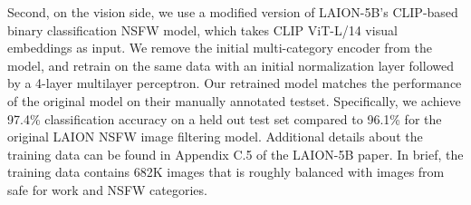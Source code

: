 \begin{table}
\renewcommand{\arraystretch}{1.1}
    \caption{Detoxify positive rates by threshold on 1 million caption subset of Common Crawl.}
    {
    \centering
    \par
    }
    \label{tab:detoxify}
\end{table}

Second, on the vision side, we use a modified version of LAION-5B's \citep{laion5b} CLIP-based binary classification NSFW model, which takes CLIP ViT-L/14 visual embeddings as input. We remove the initial multi-category encoder from the model, and retrain on the same data with an initial normalization layer followed by a 4-layer multilayer perceptron. Our retrained model matches the performance of the original model on their manually annotated testset. Specifically, we achieve 97.4\% classification accuracy on a held out test set compared to  96.1\% for the original LAION NSFW image filtering model. Additional details about the training data can be found in Appendix C.5 of the LAION-5B paper. In brief, the training data contains 682K images that is roughly balanced with images from safe for work and NSFW categories.

\begin{table}
\renewcommand{\arraystretch}{1.1}
    \caption{Comparing LAION-2B CLIP based NSFW filtering model to Google Vision API Safe Search adult category on a 40,000 random subset of Common Crawl.}
    {
    \centering
    \par
    }
    \label{tab:nsfw}
\end{table}

